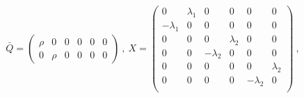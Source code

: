 \begin{equation}
\bar Q = \left( \begin{array}{cccccc} \rho & 0 & 0 & 0 & 0 & 0  \\ 
0 & \rho & 0 & 0 & 0 & 0 \end{array} \right) ~,~
X =  \left( \begin{array}{cccccc} 0 & \lambda_1 & 0 & 0 & 0 & 0  \\
-\lambda_1 & 0 & 0 & 0 & 0 & 0 \\ 
0 & 0 & 0 & \lambda_2 & 0 & 0 \\
0 & 0 & -\lambda_2 & 0 & 0 & 0 \\
0 & 0 & 0 & 0 & 0 & \lambda_2 \\
0 & 0 & 0 & 0 & -\lambda_2 & 0 \\
\end{array} 
\right) ~,
\end{equation}


